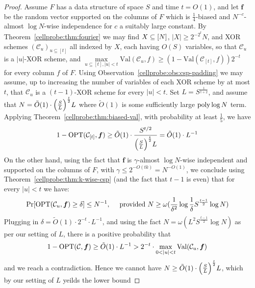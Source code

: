 \begin{proof}
Assume $F$ has a data structure of space $S$ and time $t=O(1)$, and let $\bm{f}$ be the random vector supported on the columns of $F$ which is $\frac{1}{4}$-biased and $N^{-c}$-almost $\log N$-wise independence for $c$ a suitably large constant. By Theorem~\ref{cellprobe:thm:fourier} we may find $X\subseteq [N]$, $|X| \geq 2^{-2^t}N$, and XOR schemes $(\mathcal{C}_u)_{ u \subseteq [t]}$ all indexed by $X$, each having $O(S)$ variables, so that $\mathcal{C}_u$ is a $|u|$-XOR scheme, and 
$   \max\limits_{u \subseteq [t], |u| < t} \mathrm{Val}(\mathcal{C}_u,f) \geq (1- \mathrm{Val}(\mathcal{C}_{[t]},f))2^{-t}$ for every column $f$ of $F$. Using Observation~\ref{cellprobe:obs:csp-padding} we may assume, up to increasing the number of variables of each XOR scheme by at most $t$, that $\mathcal{C}_u$ is a $(t-1)$-XOR scheme for every $|u|<t$. 
Set $L = S^{\frac{1}{t+2}}$, and assume that $N = \tilde{O}(1) \cdot \Bigl(\frac{S}{L}\Bigr)^{\frac{t}{2}}L$ where $\tilde{O}(1)$ is some sufficiently large $\mathrm{poly}\log N$ term. Applying Theorem~\ref{cellprobe:thm:biased-val}, with probability at least $\frac{1}{5}$, we have
\[
1-\mathrm{OPT}(\mathcal{C}_{[t]},\bm{f}) \geq \tilde{O}(1)\cdot  \frac{S^{t/2}}{ \Bigl(\frac{S}{L}\Bigr)^{\frac{t}{2}}L} = \tilde{O}(1) \cdot L^{-1} 
\]
On the other hand, using the fact that $\bm{f}$ is $\gamma$-almost $\log N$-wise independent and supported on the columns of $F$, with $\gamma \leq 2^{-O(tk)} = N^{-O(1)}$, we conclude using Theorem~\ref{cellprobe:thm:k-wise-csp} (and the fact that $t-1$ is even) that for every $|u|<t$ we have:
\[
\Pr[\mathrm{OPT}(\mathcal{C}_u,\bm{f}) \geq \delta] \leq N^{-1}, \quad \text{ provided }N  \geq \omega( \frac{1}{\delta^2}\log \frac{1}{\delta} S^{\frac{t-1}{2}} \log N)
\]
Plugging in $\delta  = \tilde{O}(1)\cdot  2^{-t} \cdot L^{-1}$, and using the fact $N  = \omega( L^{2} S^{\frac{t-1}{2}} \log N)$ as per our setting of $L$, there is a positive probability that 
\[
1-\mathrm{OPT}(\mathcal{C},\bm{f}) \geq  \tilde{O}(1) \cdot L^{-1} > 2^{-t} \cdot \max_{0 < |u| < t} \mathrm{Val}(\mathcal{C}_u,\bm{f})
\]
and we reach a contradiction. Hence we cannot have $N \geq  \tilde{O}(1) \cdot \Bigl(\frac{S}{L}\Bigr)^{\frac{t}{2}}L$, which by our setting of $L$ yeilds the lower bound

\end{proof}

